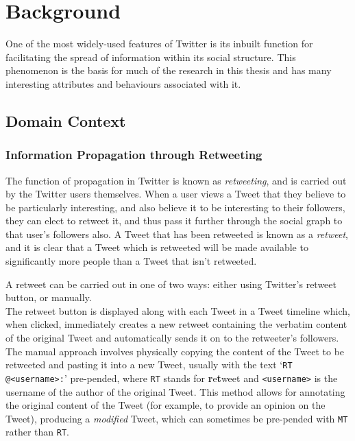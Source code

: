 \chapter{Background}


One of the most widely-used features of Twitter is its inbuilt function for facilitating the spread of information within its social structure. This phenomenon is the basis for much of the research in this thesis and has many interesting attributes and behaviours associated with it.


\section{Domain Context}

\subsection{Information Propagation through Retweeting}
The function of propagation in Twitter is known as \textit{retweeting}, and is carried out by the Twitter users themselves. When a user views a Tweet that they believe to be particularly interesting, and also believe it to be interesting to their followers, they can elect to retweet it, and thus pass it further through the social graph to that user's followers also. A Tweet that has been retweeted is known as a \textit{retweet}, and it is clear that a Tweet which is retweeted will be made available to significantly more people than a Tweet that isn't retweeted.

A retweet can be carried out in one of two ways: either using Twitter's retweet button, or manually. \\
The retweet button is displayed along with each Tweet in a Tweet timeline which, when clicked, immediately creates a new retweet containing the verbatim content of the original Tweet and automatically sends it on to the retweeter's followers.\\
The manual approach involves physically copying the content of the Tweet to be retweeted and pasting it into a new Tweet, usually with the text `\texttt{RT @<username>:}' pre-pended, where \texttt{RT} stands for \textbf{r}e\textbf{t}weet and \texttt{<username>} is the username of the author of the original Tweet. This method allows for annotating the original content of the Tweet (for example, to provide an opinion on the Tweet), producing a \textit{modified} Tweet, which can sometimes be pre-pended with \texttt{MT} rather than \texttt{RT}.

